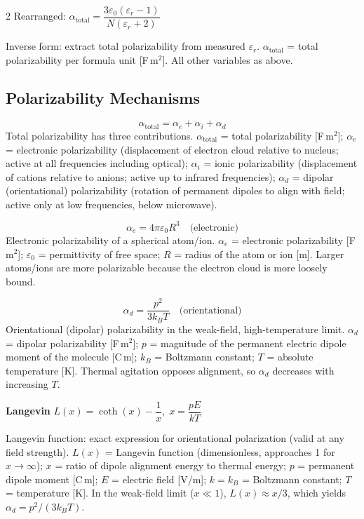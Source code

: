 \documentclass[9pt]{extarticle}
\newcommand{\eqlabel}[1]{\textbf{\scriptsize #1}\;}
\newcommand{\desc}[1]{{\small\color{desc}#1}}
\begin{document}
\begin{multicols}{2}
Rearranged: $\alpha_{\text{total}} = \dfrac{3\varepsilon_0(\varepsilon_r - 1)}{N(\varepsilon_r + 2)}$

\desc{Inverse form: extract total polarizability from measured $\varepsilon_r$. $\alpha_{\text{total}}$ = total polarizability per formula unit [F\,m$^2$]. All other variables as above.}

\subsection{Polarizability Mechanisms}
\[\alpha_{\text{total}} = \alpha_e + \alpha_i + \alpha_d\]
\desc{Total polarizability has three contributions. $\alpha_{\text{total}}$ = total polarizability [F\,m$^2$]; $\alpha_e$ = electronic polarizability (displacement of electron cloud relative to nucleus; active at all frequencies including optical); $\alpha_i$ = ionic polarizability (displacement of cations relative to anions; active up to infrared frequencies); $\alpha_d$ = dipolar (orientational) polarizability (rotation of permanent dipoles to align with field; active only at low frequencies, below microwave).}

\[\alpha_e = 4\pi\varepsilon_0 R^3 \quad\text{(electronic)}\]
\desc{Electronic polarizability of a spherical atom/ion. $\alpha_e$ = electronic polarizability [F\,m$^2$]; $\varepsilon_0$ = permittivity of free space; $R$ = radius of the atom or ion [m]. Larger atoms/ions are more polarizable because the electron cloud is more loosely bound.}

\[\alpha_d = \frac{p^2}{3k_BT} \quad\text{(orientational)}\]
\desc{Orientational (dipolar) polarizability in the weak-field, high-temperature limit. $\alpha_d$ = dipolar polarizability [F\,m$^2$]; $p$ = magnitude of the permanent electric dipole moment of the molecule [C\,m]; $k_B$ = Boltzmann constant; $T$ = absolute temperature [K]. Thermal agitation opposes alignment, so $\alpha_d$ decreases with increasing $T$.}

\eqlabel{Langevin} $L(x) = \coth(x) - \dfrac{1}{x},\; x = \dfrac{pE}{kT}$

\desc{Langevin function: exact expression for orientational polarization (valid at any field strength). $L(x)$ = Langevin function (dimensionless, approaches 1 for $x \to \infty$); $x$ = ratio of dipole alignment energy to thermal energy; $p$ = permanent dipole moment [C\,m]; $E$ = electric field [V/m]; $k = k_B$ = Boltzmann constant; $T$ = temperature [K]. In the weak-field limit ($x \ll 1$), $L(x) \approx x/3$, which yields $\alpha_d = p^2/(3k_BT)$.}


\end{multicols}
\end{document}
